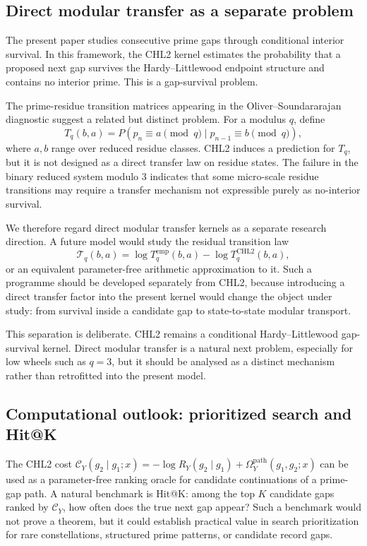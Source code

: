 \documentclass[10pt]{article}
\newcommand{\CHLtwo}{\mathrm{CHL2}}
\newcommand{\Omegapath}{\Omega_Y^{\mathrm{path}}}
\begin{document}
\subsection{Direct modular transfer as a separate problem}
The present paper studies consecutive prime gaps through conditional interior survival. In this framework, the CHL2 kernel estimates the probability that a proposed next gap survives the Hardy--Littlewood endpoint structure and contains no interior prime. This is a gap-survival problem.

The prime-residue transition matrices appearing in the Oliver--Soundararajan diagnostic suggest a related but distinct problem. For a modulus $q$, define
\[
T_q(b,a)=P(p_n\equiv a\pmod q\mid p_{n-1}\equiv b\pmod q),
\]
where $a,b$ range over reduced residue classes. CHL2 induces a prediction for $T_q$, but it is not designed as a direct transfer law on residue states. The failure in the binary reduced system modulo $3$ indicates that some micro-scale residue transitions may require a transfer mechanism not expressible purely as no-interior survival.

We therefore regard direct modular transfer kernels as a separate research direction. A future model would study the residual transition law
\[
\mathcal{T}_q(b,a)=\log T_q^{\mathrm{emp}}(b,a)-\log T_q^{\CHLtwo}(b,a),
\]
or an equivalent parameter-free arithmetic approximation to it. Such a programme should be developed separately from CHL2, because introducing a direct transfer factor into the present kernel would change the object under study: from survival inside a candidate gap to state-to-state modular transport.

This separation is deliberate. CHL2 remains a conditional Hardy--Littlewood gap-survival kernel. Direct modular transfer is a natural next problem, especially for low wheels such as $q=3$, but it should be analysed as a distinct mechanism rather than retrofitted into the present model.
\subsection{Computational outlook: prioritized search and Hit@K}
The CHL2 cost $\mathcal C_Y(g_2\mid g_1;x)=-\log R_Y(g_2\mid g_1)+\Omegapath(g_1,g_2;x)$ can be used as a parameter-free ranking oracle for candidate continuations of a prime-gap path. A natural benchmark is Hit@K: among the top $K$ candidate gaps ranked by $\mathcal C_Y$, how often does the true next gap appear? Such a benchmark would not prove a theorem, but it could establish practical value in search prioritization for rare constellations, structured prime patterns, or candidate record gaps.
\appendix
\renewcommand{\thesection}{Appendix \Alph{section}:}
\end{document}
